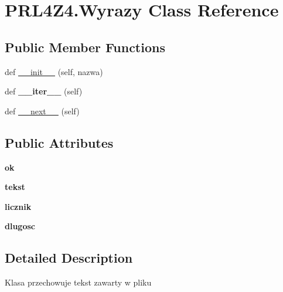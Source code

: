 \hypertarget{classPRL4Z4_1_1Wyrazy}{}\section{P\+R\+L4\+Z4.\+Wyrazy Class Reference}
\label{classPRL4Z4_1_1Wyrazy}
\subsection*{Public Member Functions}
\begin{DoxyCompactItemize}
\item 
def \hyperlink{classPRL4Z4_1_1Wyrazy_a10f2c7a864d54996a6858735a84f49e2}{\+\_\+\+\_\+init\+\_\+\+\_\+} (self, nazwa)
\item 
\mbox{\label{classPRL4Z4_1_1Wyrazy_a34df92e09f8b1203aa8c8cd6a00f8671}} 
def {\bfseries \+\_\+\+\_\+iter\+\_\+\+\_\+} (self)
\item 
def \hyperlink{classPRL4Z4_1_1Wyrazy_aaf47c6c4b074f1c1c0ca8402f93f7d82}{\+\_\+\+\_\+next\+\_\+\+\_\+} (self)
\end{DoxyCompactItemize}
\subsection*{Public Attributes}
\begin{DoxyCompactItemize}
\item 
\mbox{\label{classPRL4Z4_1_1Wyrazy_a846f04544a37f6b0b20a7f17170fe105}} 
{\bfseries ok}
\item 
\mbox{\label{classPRL4Z4_1_1Wyrazy_a3b5c17d570dfe9713efe5f5e02e74694}} 
{\bfseries tekst}
\item 
\mbox{\label{classPRL4Z4_1_1Wyrazy_ac07ff635bdaf40ec8eb70b0e81f5012a}} 
{\bfseries licznik}
\item 
\mbox{\label{classPRL4Z4_1_1Wyrazy_a8d0b1ca6a64427a6169169b5cf0b82a0}} 
{\bfseries dlugosc}
\end{DoxyCompactItemize}


\subsection{Detailed Description}
\begin{DoxyVerb}Klasa przechowuje tekst zawarty w pliku
\end{DoxyVerb}
 

